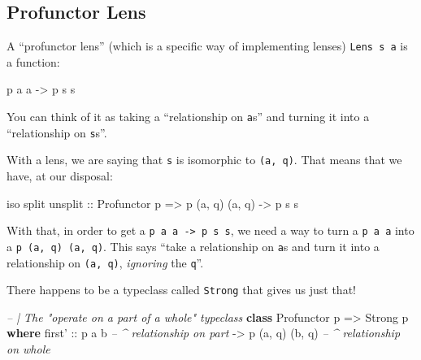 \documentclass[]{article}
\newenvironment{Shaded}{}{}
\newcommand{\CommentTok}[1]{\textcolor[rgb]{0.38,0.63,0.69}{\textit{#1}}}
\newcommand{\DataTypeTok}[1]{\textcolor[rgb]{0.56,0.13,0.00}{#1}}
\newcommand{\KeywordTok}[1]{\textcolor[rgb]{0.00,0.44,0.13}{\textbf{#1}}}
\newcommand{\NormalTok}[1]{#1}
\newcommand{\OtherTok}[1]{\textcolor[rgb]{0.00,0.44,0.13}{#1}}
\begin{document}
\hypertarget{profunctor-lens}{%
\subsection{Profunctor Lens}\label{profunctor-lens}}

A ``profunctor lens'' (which is a specific way of implementing lenses)
\texttt{Lens\textquotesingle{}\ s\ a} is a function:

\begin{Shaded}
\begin{Highlighting}[]
\NormalTok{p a a }\OtherTok{->}\NormalTok{ p s s}
\end{Highlighting}
\end{Shaded}

You can think of it as taking a ``relationship on \texttt{a}s'' and turning it
into a ``relationship on \texttt{s}s''.

With a lens, we are saying that \texttt{s} is isomorphic to \texttt{(a,\ q)}.
That means that we have, at our disposal:

\begin{Shaded}
\begin{Highlighting}[]
\NormalTok{iso split unsplit}
\OtherTok{    ::} \DataTypeTok{Profunctor}\NormalTok{ p}
    \OtherTok{=>}\NormalTok{ p (a, q) (a, q)}
    \OtherTok{->}\NormalTok{ p s s}
\end{Highlighting}
\end{Shaded}

With that, in order to get a \texttt{p\ a\ a\ -\textgreater{}\ p\ s\ s}, we need
a way to turn a \texttt{p\ a\ a} into a \texttt{p\ (a,\ q)\ (a,\ q)}. This says
``take a relationship on \texttt{a}s and turn it into a relationship on
\texttt{(a,\ q)}, \emph{ignoring} the \texttt{q}''.

There happens to be a typeclass called \texttt{Strong} that gives us just that!

\begin{Shaded}
\begin{Highlighting}[]
\CommentTok{-- | The "operate on a part of a whole" typeclass}
\KeywordTok{class} \DataTypeTok{Profunctor}\NormalTok{ p }\OtherTok{=>} \DataTypeTok{Strong}\NormalTok{ p }\KeywordTok{where}
\NormalTok{    first'}
\OtherTok{        ::}\NormalTok{ p a b                }\CommentTok{-- ^ relationship on part}
        \OtherTok{->}\NormalTok{ p (a, q) (b, q)      }\CommentTok{-- ^ relationship on whole}
\end{Highlighting}
\end{Shaded}
\end{document}
